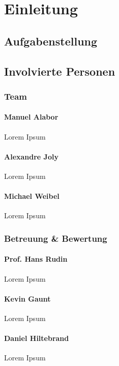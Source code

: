 \chapter{Einleitung}

\section{Aufgabenstellung}


\section{Involvierte Personen}
\subsection{Team}
\subsubsection*{Manuel Alabor}
Lorem Ipsum

\subsubsection*{Alexandre Joly}
Lorem Ipsum

\subsubsection*{Michael Weibel}
Lorem Ipsum


\subsection{Betreuung \& Bewertung}
\subsubsection*{Prof. Hans Rudin}
Lorem Ipsum

\subsubsection*{Kevin Gaunt}
Lorem Ipsum

\subsubsection*{Daniel Hiltebrand}
Lorem Ipsum